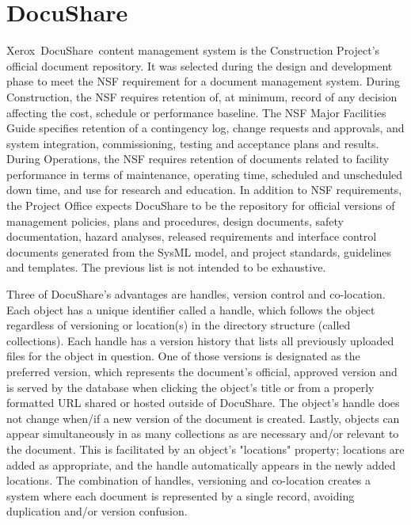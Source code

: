 \newpage
\section{DocuShare}

Xerox\textregistered\ DocuShare\textregistered\ content management system \citep{DocuShare-cite} is the Construction Project's official document repository. It was selected during the design and development phase to meet the NSF requirement for a document management system. During Construction, the NSF requires retention of, at minimum, record of any decision affecting the cost, schedule or performance baseline. The NSF Major Facilities Guide specifies retention of a contingency log, change requests and approvals, and system integration, commissioning, testing and acceptance plans and results. During Operations, the NSF requires retention of documents related to facility performance in terms of maintenance, operating time, scheduled and unscheduled down time, and use for research and education. In addition to NSF requirements, the Project Office expects DocuShare to be the repository for official versions of management policies, plans and procedures, design documents, safety documentation, hazard analyses, released requirements and interface control documents generated from the SysML model, and project standards, guidelines and templates. The previous list is not intended to be exhaustive.

Three of DocuShare's advantages are handles, version control and co-location. Each object has a unique identifier called a handle, which follows the object regardless of versioning or location(s) in the directory structure (called collections). Each handle has a version history that lists all previously uploaded files for the object in question. One of those versions is designated as the preferred version, which represents the document's official, approved version and is served by the database when clicking the object's title or from a properly formatted URL shared or hosted outside of DocuShare. The object's handle does not change when/if a new version of the document is created. Lastly, objects can appear simultaneously in as many collections as are necessary and/or relevant to the document. This is facilitated by an object's "locations" property; locations are added as appropriate, and the handle automatically appears in the newly added locations. The combination of handles, versioning and co-location creates a system where each document is represented by a single record, avoiding duplication and/or version confusion.

